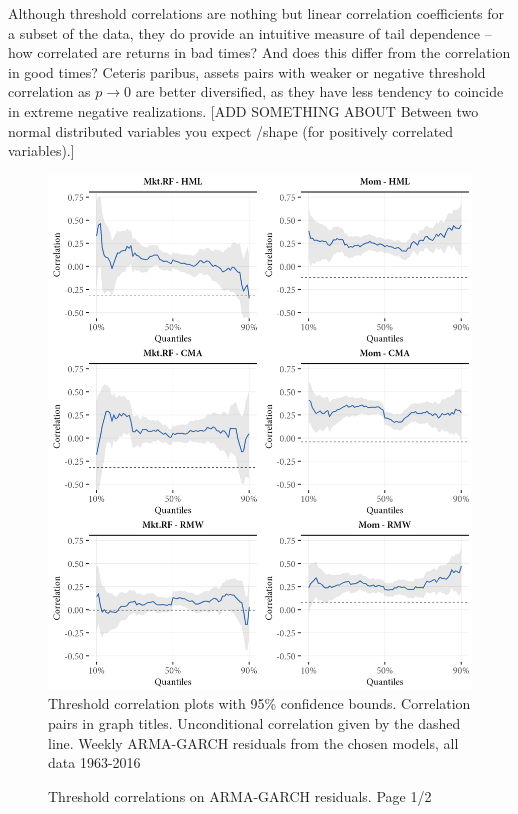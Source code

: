 Although threshold correlations are nothing but linear correlation coefficients for a subset of the data, they do provide an intuitive measure of tail dependence -- how correlated are returns in bad times? And does this differ from the correlation in good times? Ceteris paribus, assets pairs with weaker or negative threshold correlation as $p \rightarrow 0$ are better diversified, as they have less tendency to coincide in extreme negative realizations. [ADD SOMETHING ABOUT Between two normal distributed variables you expect /\-shape (for positively correlated variables).]

\begin{figure}[H]
  \caption{Threshold correlations on ARMA-GARCH residuals. Page 1/2}
  \label{fig:threshold1}
  \centering
  \begin{minipage}{\textwidth}
  \includegraphics[scale=1]{graphics/threshold1.png}  
  \vspace{3mm}
  \footnotesize
  Threshold correlation plots with 95\% confidence bounds. Correlation pairs in graph titles. Unconditional correlation given by the dashed line. Weekly ARMA-GARCH residuals from the chosen models, all data 1963-2016
  \end{minipage}
\end{figure}
